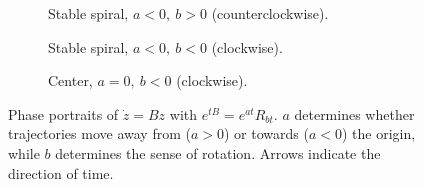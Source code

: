 \begin{example}
\begin{figure}[ht]
    \begin{subfigure}[t]{0.32\textwidth}
        \centering
        \caption{Stable spiral, $a<0,\ b>0$ (counterclockwise).}
    \end{subfigure}\hfill
    \begin{subfigure}[t]{0.32\textwidth}
        \centering
        \caption{Stable spiral, $a<0,\ b<0$ (clockwise).}
    \end{subfigure}\hfill
    \begin{subfigure}[t]{0.32\textwidth}
        \centering
        \caption{Center, $a=0,\ b<0$ (clockwise).}
    \end{subfigure}

    \caption{Phase portraits of $\dot{z}=Bz$ with $e^{tB}=e^{at}R_{bt}$. $a$ determines whether trajectories move away from ($a>0$) or towards ($a<0$) the origin, while $b$ determines the sense of rotation. Arrows indicate the direction of time.}
    \label{fig:spiral_phase_portraits}
\end{figure}
\end{example}

